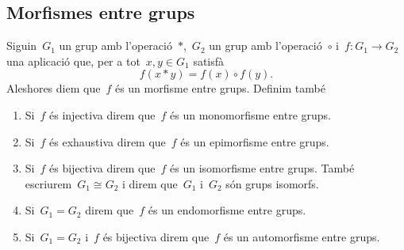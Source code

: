 \documentclass[../../Main.tex]{subfiles}
\begin{document}
	\subsection{Morfismes entre grups}
	\begin{definition}
		\label{def:morfisme entre grups}
		\label{def:monomorfisme entre grups}
		\label{def:epimorfisme entre grups}
		\label{def:isomorfisme entre grups}
		\label{def:endomorfisme entre grups}
		\label{def:automorfisme entre grups}
		Siguin~\(G_{1}\) un grup amb l'operació~\(\ast\),~\(G_{2}\) un grup amb l'operació~\(\circ\) i~\(f\colon G_{1}\to G_{2}\) una aplicació que, per a tot~\(x,y\in G_{1}\) satisfà
		\[
		    f(x\ast y)=f(x)\circ f(y).
		\]
		Aleshores diem que~\(f\) és un morfisme entre grups.
		Definim també
		\begin{enumerate}
			\item Si~\(f\) és injectiva direm que~\(f\) és un monomorfisme entre grups.
			\item Si~\(f\) és exhaustiva direm que~\(f\) és un epimorfisme entre grups.
			\item Si~\(f\) és bijectiva direm que~\(f\) és un isomorfisme entre grups.
			També escriurem~\(G_{1}\cong G_{2}\) i direm que~\(G_{1}\) i~\(G_{2}\) són grups isomorfs.
			\item Si~\(G_{1}=G_{2}\) direm que~\(f\) és un endomorfisme entre grups.
			\item Si~\(G_{1}=G_{2}\) i~\(f\) és bijectiva direm que~\(f\) és un automorfisme entre grups.
		\end{enumerate}
	\end{definition}
\end{document}
